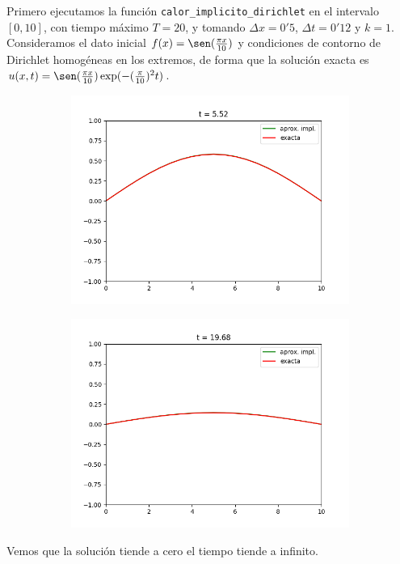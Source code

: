 \documentclass[a4paper, 12pt, oneside]{report}
\begin{document}
Primero ejecutamos la función \texttt{calor\_implicito\_dirichlet} en el intervalo $[0,10]$, con tiempo máximo $T = 20$, y tomando $\Delta x = 0'5$, $\Delta t = 0'12$ y $k = 1$. Consideramos el dato inicial $f(x) = \sen(\frac{\pi x}{10})$ y condiciones de contorno de Dirichlet homogéneas en los extremos, de forma que la solución exacta es $u(x,t) = \sen(\frac{\pi x}{10})\exp(-(\frac{\pi}{10})^2t)$.
\begin{figure}[H]
\centering
\begin{subfigure}[b]{0.49\textwidth}
    \centering
    \includegraphics[scale = 0.45]{./images/Figure_1.png}
\end{subfigure}
\begin{subfigure}[b]{0.49\textwidth}
    \centering
    \includegraphics[scale = 0.45]{./images/Figure_2.png}
\end{subfigure}
\end{figure}
\noindent Vemos que la solución tiende a cero el tiempo tiende a infinito.
\end{document}
